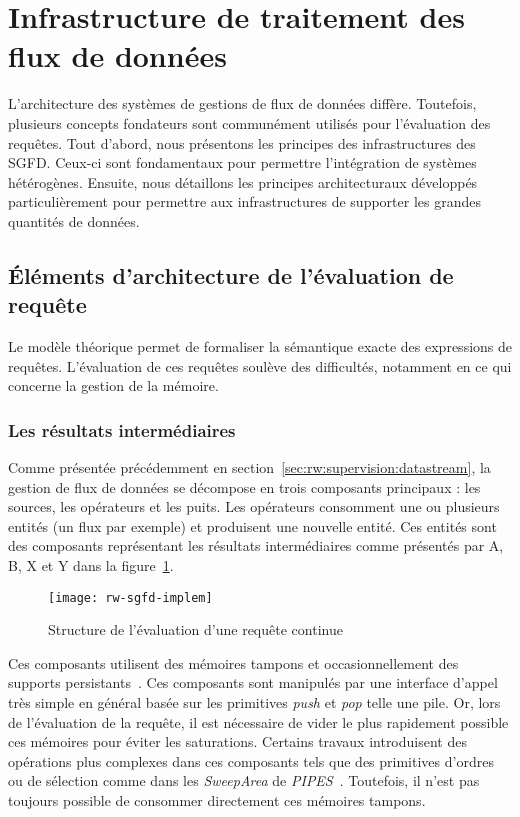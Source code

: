 \section{Infrastructure de traitement des flux de données}\label{sec:rw:sgfd:infra}
L'architecture des systèmes de gestions de flux de données diffère. Toutefois, plusieurs concepts fondateurs sont communément utilisés pour l'évaluation des requêtes. Tout d'abord, nous présentons les principes des infrastructures des SGFD. Ceux-ci sont fondamentaux pour permettre l'intégration de systèmes hétérogènes. Ensuite, nous détaillons les principes architecturaux développés particulièrement pour permettre aux infrastructures de supporter les grandes quantités de données.

\subsection{Éléments d'architecture de l'évaluation de requête}
Le modèle théorique permet de formaliser la sémantique exacte des expressions de requêtes. L'évaluation de ces requêtes soulève des difficultés, notamment en ce qui concerne la gestion de la mémoire.

\subsubsection{Les résultats intermédiaires}
Comme présentée précédemment en section~\ref{sec:rw:supervision:datastream}, la gestion de flux de données se décompose en trois composants principaux : les sources, les opérateurs et les puits. Les opérateurs consomment une ou plusieurs entités (un flux par exemple) et produisent une nouvelle entité. Ces entités sont des composants représentant les résultats intermédiaires comme présentés par A, B, X et Y dans la figure~\ref{fig:rw:sgfd:implem}.
\begin{figure}[ht]
    \centering
    \texttt{[image: rw-sgfd-implem]}
    \caption{Structure de l'évaluation d'une requête continue}\label{fig:rw:sgfd:implem}
\end{figure}

Ces composants utilisent des mémoires tampons et occasionnellement des supports persistants~\cite{Abadi:aurora}. Ces composants sont manipulés par une interface d'appel très simple en général basée sur les primitives \textit{push} et \textit{pop} telle une pile. Or, lors de l'évaluation de la requête, il est nécessaire de vider le plus rapidement possible ces mémoires pour éviter les saturations. Certains travaux introduisent des opérations plus complexes dans ces composants tels que des primitives d'ordres ou de sélection comme dans les \textit{SweepArea} de \textit{PIPES}~\cite{Kramer:semantics}. Toutefois, il n'est pas toujours possible de consommer directement ces mémoires tampons.

